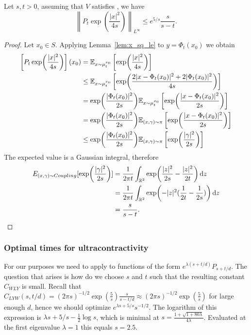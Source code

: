 \begin{lemma}
    Let $s,t > 0$, assuming that $V$ satisfies , we have
    \[ 
        \left\|P_t \exp\left(\frac{|x|^2}{4s}\right)\right\|_{L^{\infty}} \le e^{5/s} \frac{s}{s-t}.
    \]
\end{lemma}
\begin{proof}
    Let \( x_0 \in S \).
    Applying Lemma~\ref{lem:x_sq_le} to \( y = \Phi_{t}(x_0) \) we obtain
    \begin{align*}
        \left[P_{t} \exp(\frac{|x|^2}{4s})\right](x_0) 
        &= \mathbb{E}_{x \sim \mu_{t}^{x_0}} \left[ \exp(\frac{|x|^2}{4s}) \right] \\
        &\le \mathbb{E}_{x \sim \mu_{t}^{x_0}} \left[ \exp(\frac{2|x-\Phi_{t}(x_0)|^2 + 2|\Phi_{t}(x_0)|^2}{4s}) \right] \\
        &= \exp(\frac{|\Phi_{t}(x_0)|^2}{2s}) \mathbb{E}_{x \sim \mu_{t}^{x_0}} \left[ \exp(\frac{|x-\Phi_{t}(x_0)|^2}{2 s}) \right] \\
        &= \exp(\frac{|\Phi_{t}(x_0)|^2}{2s}) \mathbb{E}_{(x,\gamma) \sim \pi}\left[\exp(\frac{|x-\Phi_{t}(x_0)|^2}{2 s})\right] \\
        &\le \exp(\frac{|\Phi_{t}(x_0)|^2}{2s}) \mathbb{E}_{(x,\gamma) \sim \pi}\left[\exp(\frac{|\gamma|^2}{2 s})\right]
    \end{align*}
    The expected value is a Gaussian integral, therefore
    \begin{align*}
        E_{(x,\gamma) \sim Coupling}[\exp(\frac{|\gamma|^2}{2 s}) ]
        &= \frac{1}{2\pi t} \int_{\mathbb{R}^2} \exp(\frac{|z|^2}{2 s} -\frac{|z|^2}{2t}) \dd{z} \\
        &= \frac{1}{2\pi t}\int_{\mathbb{R}^2} \exp(-|z|^2(\frac{1}{2 t} -\frac{1}{2s})) \dd{z} \\
        &= \frac{s}{s - t}.
    \end{align*}
\end{proof}

\subsubsection*{Optimal times for ultracontractivity}

For our purposes we need to apply  to functions  of the form $e^{\lambda (s+t/d)}P_{s+t/d}$. The question that arises is how do we choose $s$ and $t$ such that the resulting constant $C_{WLY}$ is small. Recall that $C_{LYW}(s,t/d) = (2 \pi s)^{-1/2}  \exp(\frac{5}{s})\frac{s}{s-t/d} \approx (2 \pi s)^{-1/2}  \exp(\frac{5}{s})$ for large enough $d$, hence we should optimize $e^{\lambda s +5/s} s^{-1/2}$. The logarithm of this expression is $\lambda s + 5/s - \frac{1}{2}\log s$, which is minimal at $s = \frac{1 + \sqrt{1+80\lambda}}{4 \lambda}$. Evaluated at the first eigenvalue $\lambda=1$ this equals $s=2.5$.